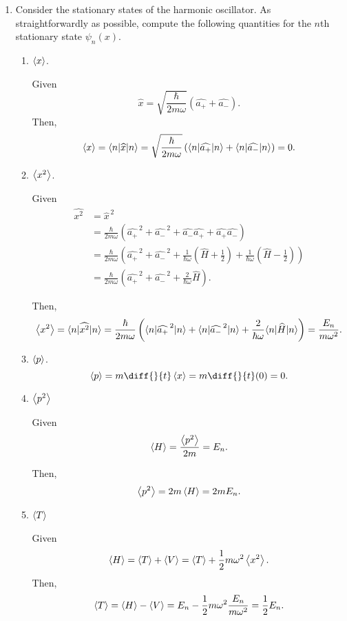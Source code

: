 \documentclass[a4paper, 12pt]{config/homework}
\begin{document}
\begin{enumerate}
\pagebreak
\item Consider the stationary states of the harmonic oscillator. As straightforwardly as possible, compute the following quantities for the \(n\)th stationary state \(\psi_n(x)\).
\begin{enumerate}[label=(\alph*)]
\item \(\left\langle x \right\rangle\).

Given
\[\widehat{x} = \sqrt{\frac{\hbar}{2m\omega}}\left(\widehat{a_+} + \widehat{a_-}\right).\]
Then,
\[\expval{x}
= \bra*{n}\widehat{x}\ket*{n}
= \sqrt{\frac{\hbar}{2m\omega}}\left(\bra*{n}\widehat{a_+}\ket*{n} + \bra*{n}\widehat{a_-}\ket*{n}\right)
= 0.\]

\item \(\left\langle x^2 \right\rangle\).

Given
\begin{align*}
\widehat{x^2} &= \widehat{x}^{\,2}
\\&= \frac{\hbar}{2m\omega} \left(\widehat{a_+}^{\,2} + \widehat{a_-}^{\,2} + \widehat{a_-}\widehat{a_+} + \widehat{a_+}\widehat{a_-}\right)
\\&= \frac{\hbar}{2m\omega} \left(\widehat{a_+}^{\,2} + \widehat{a_-}^{\,2} + \frac{1}{\hbar \omega}\left(\widehat{H}+\frac{1}{2}\right) + \frac{1}{\hbar \omega}\left(\widehat{H}-\frac{1}{2}\right)\right)
\\&= \frac{\hbar}{2m\omega} \left(\widehat{a_+}^{\,2} + \widehat{a_-}^{\,2} + \frac{2}{\hbar \omega}\widehat{H}\right).
\end{align*}

Then,
\[\expval{x^2} = \bra*{n}\widehat{x^2}\ket*{n} = \frac{\hbar}{2m\omega} \left( \bra*{n}\widehat{a_+}^{\,2}\ket*{n} + \bra*{n}\widehat{a_-}^{\,2}\ket*{n} + \frac{2}{\hbar \omega}\bra*{n}\widehat{H}\ket*{n}\right) = \frac{E_n}{m\omega^2}.\]

\item \(\left\langle p \right\rangle\).
\[\expval{p} = m\diff{}{t}\expval{x} = m\diff{}{t}(0) = 0.\]

\item \(\left\langle p^2 \right\rangle\)

Given
\[\left\langle H \right\rangle = \frac{\left\langle p^2 \right\rangle}{2m} = E_n.\]

Then,
\[\left\langle p^2 \right\rangle = 2m\left\langle H \right\rangle = 2m E_n.\]

\item \(\left\langle T \right\rangle\)

Given
\[\left\langle H \right\rangle = \left\langle T \right\rangle + \left\langle V \right\rangle = \left\langle T \right\rangle + \frac{1}{2}m\omega^2\left\langle x^2 \right\rangle.\]
Then,
\[\left\langle T \right\rangle = \left\langle H \right\rangle - \left\langle V \right\rangle = E_n - \frac{1}{2}m\omega^2\frac{E_n}{m\omega^2} = \frac{1}{2}E_n.\]


\end{enumerate}
\end{enumerate}
\end{document}
